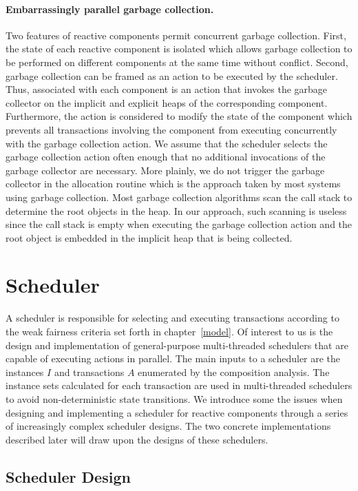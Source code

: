 \paragraph{Embarrassingly parallel garbage collection.}
Two features of reactive components permit concurrent garbage collection.
First, the state of each reactive component is isolated which allows garbage collection to be performed on different components at the same time without conflict.
Second, garbage collection can be framed as an action to be executed by the scheduler.
Thus, associated with each component is an action that invokes the garbage collector on the implicit and explicit heaps of the corresponding component.
Furthermore, the action is considered to modify the state of the component which prevents all transactions involving the component from executing concurrently with the garbage collection action.
We assume that the scheduler selects the garbage collection action often enough that no additional invocations of the garbage collector are necessary.
More plainly, we do not trigger the garbage collector in the allocation routine which is the approach taken by most systems using garbage collection.
Most garbage collection algorithms scan the call stack to determine the root objects in the heap.
In our approach, such scanning is useless since the call stack is empty when executing the garbage collection action and the root object is embedded in the implicit heap that is being collected.

\section{Scheduler}

A scheduler is responsible for selecting and executing transactions according to the weak fairness criteria set forth in chapter~\ref{model}.
Of interest to us is the design and implementation of general-purpose multi-threaded schedulers that are capable of executing actions in parallel.
The main inputs to a scheduler are the instances $I$ and transactions $A$ enumerated by the composition analysis.
The instance sets calculated for each transaction are used in multi-threaded schedulers to avoid non-deterministic state transitions.
We introduce some the issues when designing and implementing a scheduler for reactive components through a series of increasingly complex scheduler designs.
The two concrete implementations described later will draw upon the designs of these schedulers.

\subsection{Scheduler Design}

